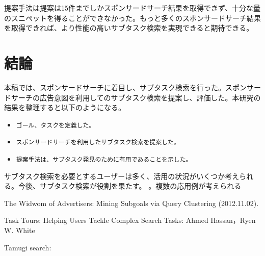 \documentclass[submit,techreq]{ipsj}
\def\|{\verb|}
\begin{document}
提案手法は提案は15件までしかスポンサードサーチ結果を取得できず、十分な量のスニペットを得ることができなかった。もっと多くのスポンサードサーチ結果を取得できれば、より性能の高いサブタスク検索を実現できると期待できる。


%7
\section{結論}
本稿では、スポンサードサーチに着目し、サブタスク検索を行った。スポンサードサーチの広告意図を利用してのサブタスク検索を提案し、評価した。本研究の結果を整理すると以下のようになる。


\begin{itemize}
\item \|ゴール、タスクを定義した。|
\item \|スポンサードサーチを利用したサブタスク検索を提案した。|
\item \|提案手法は、サブタスク発見のために有用であることを示した。|
\end{itemize}

サブタスク検索を必要とするユーザーは多く、活用の状況がいくつか考えられる。今後、サブタスク検索が役割を果たす。
。複数の応用例が考えられる


\begin{thebibliography}{10}


The Widwom of Advertisers: Mining Subgoals via Query Clustering
(2012.11.02).

Task Tours: Helping Users Tackle Complex Search Tasks:
Ahmed Hassan，Ryen W. White

Tamugi search:




\end{thebibliography}



\begin{biography}
%
\end{biography}
\end{document}
